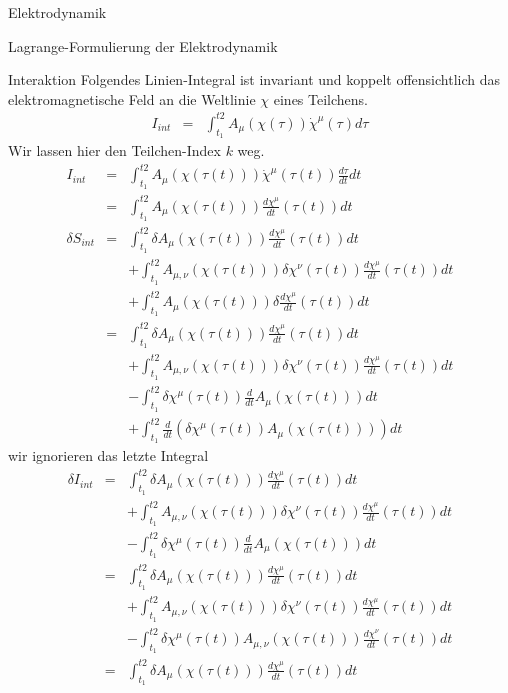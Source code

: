 \begin{chapter}{\titlestr}
\begin{section}{Elektrodynamik}
\begin{subsection}{Lagrange-Formulierung der Elektrodynamik}
\begin{subsubsection}{Interaktion}
Folgendes Linien-Integral ist invariant und koppelt offensichtlich das elektromagnetische Feld an die Weltlinie $\chi$ eines Teilchens.
\begin{eqnarray*}
I_{int} &=& \int_{t_1}^{t2} A_\mu(\chi(\tau))\dot{\chi}^\mu(\tau)d\tau
\end{eqnarray*}
Wir lassen hier den Teilchen-Index $k$ weg.
\begin{eqnarray*}
I_{int} &=& \int_{t_1}^{t2} A_\mu(\chi(\tau(t)))\dot{\chi}^\mu(\tau(t))\frac{d\tau}{dt}dt\\
&=& \int_{t_1}^{t2} A_\mu(\chi(\tau(t)))\frac{d\chi^\mu}{dt}(\tau(t))dt\\
\delta S_{int} &=& \int_{t_1}^{t2} \delta A_\mu(\chi(\tau(t)))\frac{d\chi^\mu}{dt}(\tau(t))dt\\
&&+\int_{t_1}^{t2} A_{\mu,\nu}(\chi(\tau(t)))\delta\chi^\nu(\tau(t))\frac{d\chi^\mu}{dt}(\tau(t))dt\\
&&+\int_{t_1}^{t2} A_\mu(\chi(\tau(t)))\delta\frac{d\chi^\mu}{dt}(\tau(t))dt\\
&=& \int_{t_1}^{t2} \delta A_\mu(\chi(\tau(t)))\frac{d\chi^\mu}{dt}(\tau(t))dt\\
&&+\int_{t_1}^{t2} A_{\mu,\nu}(\chi(\tau(t)))\delta\chi^\nu(\tau(t))\frac{d\chi^\mu}{dt}(\tau(t))dt\\
&&-\int_{t_1}^{t2} \delta \chi^\mu (\tau(t))\frac{d}{dt}A_\mu(\chi(\tau(t)))dt\\
&&+\int_{t_1}^{t2} \frac{d}{dt}\left(\delta \chi^\mu (\tau(t))A_\mu(\chi(\tau(t)))\right)dt
\end{eqnarray*}
wir ignorieren das letzte Integral
\begin{eqnarray*}
\delta I_{int} &=& \int_{t_1}^{t2} \delta A_\mu(\chi(\tau(t)))\frac{d\chi^\mu}{dt}(\tau(t))dt\\
&&+\int_{t_1}^{t2} A_{\mu,\nu}(\chi(\tau(t)))\delta\chi^\nu(\tau(t))\frac{d\chi^\mu}{dt}(\tau(t))dt\\
&&-\int_{t_1}^{t2} \delta \chi^\mu (\tau(t))\frac{d}{dt}A_\mu(\chi(\tau(t)))dt\\
&=& \int_{t_1}^{t2} \delta A_\mu(\chi(\tau(t)))\frac{d\chi^\mu}{dt}(\tau(t))dt\\
&&+\int_{t_1}^{t2} A_{\mu,\nu}(\chi(\tau(t)))\delta\chi^\nu(\tau(t))\frac{d\chi^\mu}{dt}(\tau(t))dt\\
&&-\int_{t_1}^{t2} \delta \chi^\mu (\tau(t))A_{\mu,\nu}(\chi(\tau(t)))\frac{d\chi^\nu}{dt}(\tau(t))dt\\
&=& \int_{t_1}^{t2} \delta A_\mu(\chi(\tau(t)))\frac{d\chi^\mu}{dt}(\tau(t))dt\\

\end{eqnarray*}
\end{subsubsection}
\end{subsection}
\end{section}
\end{chapter}

